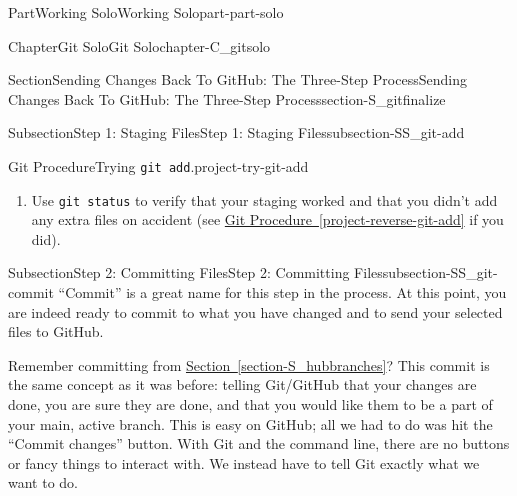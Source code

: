 \documentclass[oneside,10pt,]{book}
\newcommand{\blocktitlefont}{\relax}
\newcommand{\xreffont}{\relax}
\newcommand{\mono}[1]{\texttt{#1}}
\newcommand{\kbd}[1]{\keys{{#1}}}
\begin{document}
\begin{partptx}{Part}{Working Solo}{}{Working Solo}{}{}{part-part-solo}
\begin{chapterptx}{Chapter}{Git Solo}{}{Git Solo}{}{}{chapter-C_gitsolo}
\begin{sectionptx}{Section}{Sending Changes Back To GitHub: The Three-Step Process}{}{Sending Changes Back To GitHub: The Three-Step Process}{}{}{section-S_gitfinalize}
\begin{subsectionptx}{Subsection}{Step 1: Staging Files}{}{Step 1: Staging Files}{}{}{subsection-SS_git-add}
\begin{project}{Git Procedure}{Trying \mono{git add}.}{project-try-git-add}
\begin{enumerate}[font=\bfseries,label=(\alph*),ref=\alph*]
\begin{descriptionlist}
\begin{dlimedium}{You want to add an entire folder of files}{li-try-git-add-d-a-a-b-b}
\end{dlimedium}%
\begin{dlimedium}{You want to add all changed \slash{} created \slash{} deleted files}{li-try-git-add-d-a-a-b-c}%
Type in a single period (\kbd{.}) instead of file names.%
\end{dlimedium}%
\end{descriptionlist}
%
\par
You can run as many or as little \mono{git add} commands as you wish. For instance, you could do \mono{git add images/ my\_file.txt} or you could do \mono{git add images/} and then do \mono{git add my\_file.txt} separately. It's up to you and how comfortable you feel with Git.%
\par
Try now to stage your README file using one of the three cases above.%
\par\smallskip%
\noindent\textbf{\blocktitlefont Hint}.\hypertarget{hint-try-git-add-d-b}{}\quad{}Case 1 or Case 3 will work in this instance.%
\item{}Use \mono{git status} to verify that your staging worked and that you didn't add any extra files on accident (see \hyperref[project-reverse-git-add]{Git Procedure~{\xreffont\ref{project-reverse-git-add}}} if you did).%
\end{enumerate}%
\end{project}%
\end{subsectionptx}
%
%
\typeout{************************************************}
\typeout{************************************************}
%
\begin{subsectionptx}{Subsection}{Step 2: Committing Files}{}{Step 2: Committing Files}{}{}{subsection-SS_git-commit}
%
%
%
%
``Commit'' is a great name for this step in the process. At this point, you are indeed ready to commit to what you have changed and to send your selected files to GitHub.%
\par
Remember committing from \hyperref[section-S_hubbranches]{Section~{\xreffont\ref{section-S_hubbranches}}}? This commit is the same concept as it was before: telling Git\slash{}GitHub that your changes are done, you are sure they are done, and that you would like them to be a part of your main, active branch. This is easy on GitHub; all we had to do was hit the ``Commit changes'' button. With Git and the command line, there are no buttons or fancy things to interact with. We instead have to tell Git exactly what we want to do.%

\end{subsectionptx}
\end{sectionptx}
\end{chapterptx}
\end{partptx}
\end{document}
